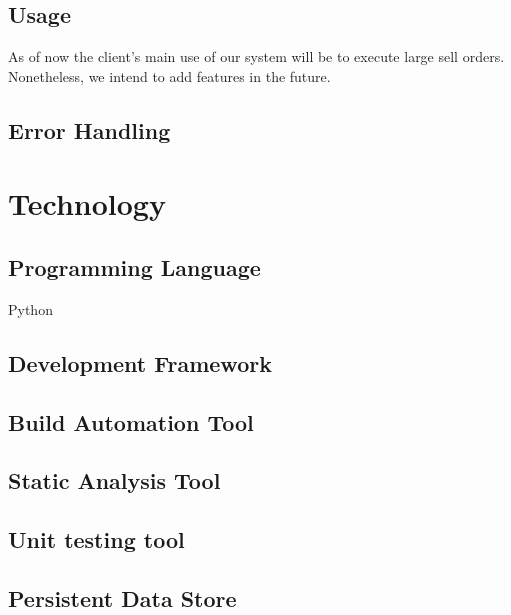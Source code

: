 \documentclass{article}
\begin{document}
\subsection{Usage}
As of now the client's main use of our system will be to execute large sell orders. Nonetheless, we intend to add features in the future.

\subsection{Error Handling}

\section{Technology}

\subsection{Programming Language}
Python
\subsection{Development Framework}

\subsection{Build Automation Tool}

\subsection{Static Analysis Tool}

\subsection{Unit testing tool}

\subsection{Persistent Data Store} 
\end{document}
